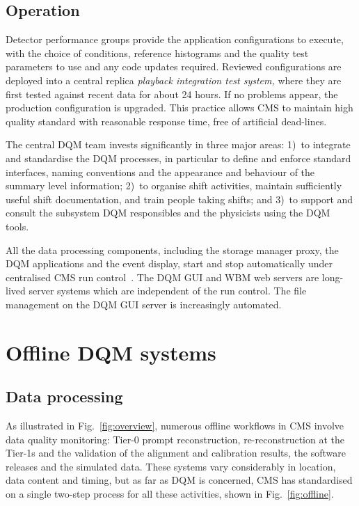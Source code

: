 \documentclass[a4paper]{jpconf}
\begin{document}
\subsection{Operation}

Detector performance groups provide the application configurations to execute,
with the choice of conditions, reference histograms and the quality test
parameters to use and any code updates required.  Reviewed configurations are
deployed into a central replica {\em playback integration test system,} where
they are first tested against recent data for about 24 hours.  If no problems
appear, the production configuration is upgraded.  This practice allows CMS to
maintain high quality standard with reasonable response time, free of
artificial dead-lines.

The central DQM team invests significantly in three major areas: 1)~to
integrate and standardise the DQM processes, in particular to define and
enforce standard interfaces, naming conventions and the appearance and behaviour
of the summary level information; 2)~to organise shift activities, maintain
sufficiently useful shift documentation, and train people taking shifts; and
3)~to support and consult the subsystem DQM responsibles and the physicists
using the DQM tools.

All the data processing components, including the storage manager proxy, the
DQM applications and the event display, start and stop automatically under
centralised CMS run control~\cite{runcontrol}.  The DQM GUI and WBM web
servers are long-lived server systems which are independent of the run
control.  The file management on the DQM GUI server is increasingly automated.


\section{Offline DQM systems}
\subsection{Data processing}

As illustrated in Fig.~\ref{fig:overview}, numerous offline workflows in CMS
involve data quality monitoring: Tier-0 prompt reconstruction,
re-reconstruction at the Tier-1s and the validation of the alignment and
calibration results, the software releases and the simulated data.  These
systems vary considerably in location, data content and timing, but as far as
DQM is concerned, CMS has standardised on a single two-step process for all
these activities, shown in Fig.~\ref{fig:offline}.
\end{document}
